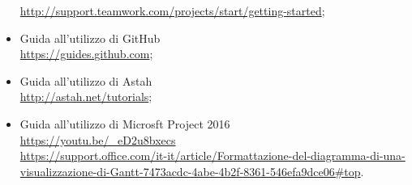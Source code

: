 \begin{itemize}
	\url{http://support.teamwork.com/projects/start/getting-started};
	\item Guida all'utilizzo di GitHub\G\\
	\url{https://guides.github.com};
	\item Guida all'utilizzo di Astah\G\\
	\url{http://astah.net/tutorials};
	\item Guida all'utilizzo di Microsft Project 2016\G \\
	\url{https://youtu.be/_eD2u8bxecs} \\
   \def\UrlBreaks{\do\/\do-}
    \url{https://support.office.com/it-it/article/Formattazione-del-diagramma-di-una-visualizzazione-di-Gantt-7473acdc-4abe-4b2f-8361-546efa9dce06#top}.
\end{itemize}
\newpage
